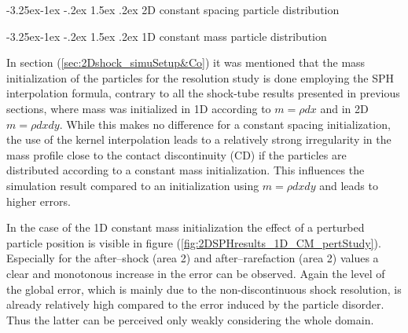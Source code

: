 \documentclass[11pt,a4paper,twoside]{report}
\makeatletter
\renewcommand\paragraph{\@startsection{paragraph}{4}{\z@}%
  {-3.25ex\@plus -1ex \@minus -.2ex}%
  {1.5ex \@plus .2ex}%
  {\normalfont\normalsize\bfseries}}
\makeatother
\begin{document}
\paragraph{2D constant spacing particle distribution}


\paragraph{1D constant mass particle distribution}

In section (\ref{sec:2Dshock_simuSetup&Co}) it was mentioned that the mass initialization of the particles for the resolution study is done employing the SPH interpolation formula, contrary to all the shock-tube results presented in previous sections, where mass was initialized in 1D according to $m=\rho dx$ and in 2D $m=\rho dx dy$. While this makes no difference for a constant spacing initialization, the use of the kernel interpolation leads to a relatively strong irregularity in the mass profile close to the contact discontinuity (CD) if the particles are distributed according to a constant mass initialization. This  influences the simulation result compared to an initialization using $m=\rho dx dy$ and leads to higher errors.  


In the case of the 1D constant mass initialization the effect of a perturbed particle position is visible in figure (\ref{fig:2DSPHresults_1D_CM_pertStudy}). 
Especially for the after--shock (area 2) and after--rarefaction (area 2) values a clear and monotonous increase in the error can be observed. Again the level of the global error, which is mainly due to the non-discontinuous shock resolution, is already relatively high compared to the error induced by the particle disorder. Thus the latter can be perceived only weakly considering the whole domain.
\end{document}
